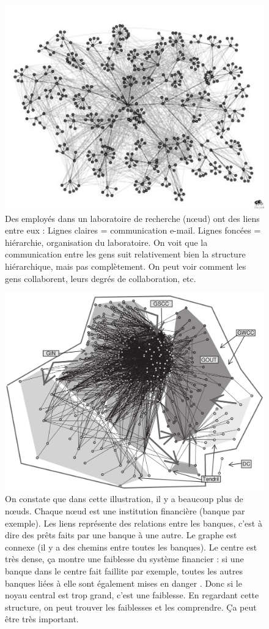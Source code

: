 \begin{figure}[!ht]
\centering
\includegraphics[width=0.75\linewidth]{images/social_networks_based_on_communication_and_interaction.png}
\caption{Des employés dans un laboratoire de recherche (n\oe ud) ont des
    liens entre eux : Lignes claires = communication e-mail. Lignes
    foncées = hiérarchie, organisation du laboratoire. On voit que la
    communication entre les gens suit relativement bien la structure
    hiérarchique, mais pas complètement. On peut voir comment les gens
collaborent, leurs degrés de collaboration, etc.}
\end{figure}

\begin{figure}[!ht]
\centering
\includegraphics[width=0.65\linewidth]{images/reseaux_prets_entre_banques.png}
\caption{On constate que dans cette illustration, il y a beaucoup plus
    de nœuds. Chaque nœud est une institution financière (banque par
    exemple). Les liens représente des relations entre les banques,
    c'est à dire des prêts faits par une banque à une autre. Le graphe
    est connexe (il y a des chemins entre toutes les banques). Le centre
    est très dense, ça montre une faiblesse du système financier : si
    une banque dans le centre fait faillite par exemple, toutes les
    autres banques liées à elle sont également mises en danger . Donc si
    le noyau central est trop grand, c'est une faiblesse. En regardant
    cette structure, on peut trouver les faiblesses et les comprendre.
Ça peut être très important.}
\end{figure}

